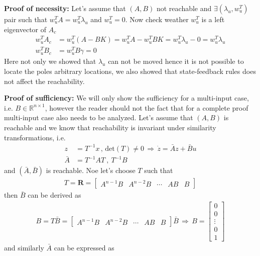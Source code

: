 \documentclass[twoside]{article}
\begin{document}
\textbf{Proof of necessity: } Let's assume that $(A,B)$ not reachable and $\exists (\lambda_u , w_u^T)$ pair such that
$w_u^T A = w_u^T \lambda_u $ and $w_u^T = 0$. Now check weather $w_u^T$ is a left eigenvector of $A_c$
%
\begin{align*}
	w_u^T A_c &= w_u^T (A - B K ) = w_u^T A - w_u^T B K = w_u^T \lambda_u - 0 = w_u^T \lambda_u
	\\
	w_u^T B_c &= w_u^T B \gamma = 0
\end{align*} 
%
Here not only we showed that $\lambda_u$ can not be moved hence it is not possible to locate the poles
arbitrary locations, we also showed that state-feedback rules does not affect the reachability.

\textbf{Proof of sufficiency:} We will only show the sufficiency for a multi-input case, i.e. $B \in \mathbb{R}^{n \times 1}$, 
however the reader should not the fact that for a complete proof multi-input case also needs to be analyzed. 
Let's assume that $(A,B)$ is reachable and we know that reachability is invariant under similarity transformations, i.e.
%
\begin{align*}
	z &= T^{-1} x \, , \, \mathrm{det}(T) \neq 0 \, \Rightarrow \, \dot{z} = \bar{A} z + \bar{B} u \\
	\bar{A} &= T^{-1} A T \ , \ T^{-1} B 
\end{align*}
%
and $(\bar{A}, \bar{B})$ is reachable. Noe let's choose $T$ such that
%
\begin{align*}
T = \mathbf{R} = \left[ \begin{array}{c|c|c|c|c} A^{n-1} B & A^{n-2} B & \cdots & A B &  B \end{array} \right]
\end{align*}
%
then $\bar{B}$ can be derived as
% 
\begin{align*}
B = T \bar{B} = \left[ \begin{array}{c|c|c|c|c} A^{n-1} B & A^{n-2} B & \cdots & A B &  B \end{array} \right] \bar{B} 
\, \Rightarrow \, B = \begin{bmatrix} 0 \\ 0 \\ \vdots \\ 0 \\ 1 \end{bmatrix}
\end{align*}
%
and similarly $\bar{A}$ can be expressed as
\end{document}
